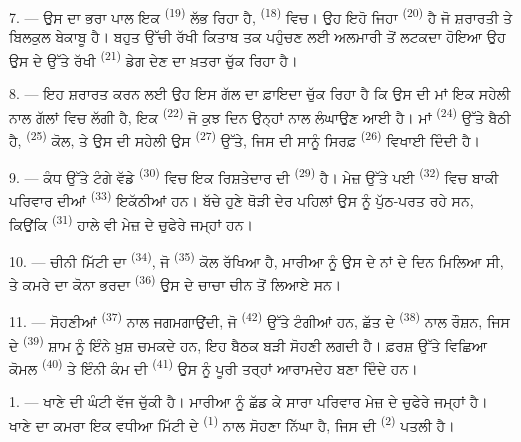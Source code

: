 \VUsaut{5.0mm}
\VUsaut{3.0mm}

7. --- ਉਸ ਦਾ ਭਰਾ ਪਾਲ ਇਕ  \textsuperscript{(19)} ਲੱਭ ਰਿਹਾ ਹੈ,
 \textsuperscript{(18)} ਵਿਚ। ਉਹ ਇਹੋ ਜਿਹਾ 
\textsuperscript{(20)} ਹੈ ਜੋ ਸ਼ਰਾਰਤੀ ਤੇ ਬਿਲਕੁਲ ਬੇਕਾਬੂ ਹੈ। ਬਹੁਤ ਉੱਚੀ ਰੱਖੀ ਕਿਤਾਬ ਤਕ
ਪਹੁੰਚਣ ਲਈ ਅਲਮਾਰੀ ਤੋਂ ਲਟਕਦਾ ਹੋਇਆ ਉਹ ਉਸ ਦੇ ਉੱਤੇ ਰੱਖੀ 
\textsuperscript{(21)} ਡੇਗ ਦੇਣ ਦਾ ਖ਼ਤਰਾ ਚੁੱਕ ਰਿਹਾ ਹੈ।

8. --- ਇਹ ਸ਼ਰਾਰਤ ਕਰਨ ਲਈ ਉਹ ਇਸ ਗੱਲ ਦਾ ਫ਼ਾਇਦਾ ਚੁੱਕ ਰਿਹਾ ਹੈ ਕਿ ਉਸ ਦੀ ਮਾਂ ਇਕ ਸਹੇਲੀ
ਨਾਲ ਗੱਲਾਂ ਵਿਚ ਲੱਗੀ ਹੈ, ਇਕ  \textsuperscript{(22)} ਜੋ ਕੁਝ ਦਿਨ ਉਨ੍ਹਾਂ
ਨਾਲ ਲੰਘਾਉਣ ਆਈ ਹੈ। ਮਾਂ  \textsuperscript{(24)} ਉੱਤੇ ਬੈਠੀ ਹੈ,
 \textsuperscript{(25)} ਕੋਲ, ਤੇ ਉਸ ਦੀ ਸਹੇਲੀ ਉਸ 
\textsuperscript{(27)} ਉੱਤੇ, ਜਿਸ ਦੀ ਸਾਨੂੰ ਸਿਰਫ਼ 
\textsuperscript{(26)} ਵਿਖਾਈ ਦਿੰਦੀ ਹੈ।

9. --- ਕੰਧ ਉੱਤੇ ਟੰਗੇ ਵੱਡੇ  \textsuperscript{(30)} ਵਿਚ ਇਕ ਰਿਸ਼ਤੇਦਾਰ
ਦੀ  \textsuperscript{(29)} ਹੈ। ਮੇਜ਼ ਉੱਤੇ ਪਈ 
\textsuperscript{(32)} ਵਿਚ ਬਾਕੀ ਪਰਿਵਾਰ ਦੀਆਂ 
\textsuperscript{(33)} ਇਕੱਠੀਆਂ ਹਨ। ਬੱਚੇ ਹੁਣੇ ਥੋੜੀ ਦੇਰ ਪਹਿਲਾਂ ਉਸ ਨੂੰ ਪੁੱਠ-ਪਰਤ ਰਹੇ
ਸਨ, ਕਿਉਂਕਿ  \textsuperscript{(31)} ਹਾਲੇ ਵੀ ਮੇਜ਼ ਦੇ ਚੁਫੇਰੇ ਜਮ੍ਹਾਂ
ਹਨ।

10. --- ਚੀਨੀ ਮਿੱਟੀ ਦਾ  \textsuperscript{(34)}, ਜੋ
 \textsuperscript{(35)} ਕੋਲ ਰੱਖਿਆ ਹੈ, ਮਾਰੀਆ ਨੂੰ ਉਸ ਦੇ
ਨਾਂ ਦੇ ਦਿਨ ਮਿਲਿਆ ਸੀ, ਤੇ ਕਮਰੇ ਦਾ ਕੋਨਾ ਭਰਦਾ 
\textsuperscript{(36)} ਉਸ ਦੇ ਚਾਚਾ ਚੀਨ ਤੋਂ ਲਿਆਏ ਸਨ।

11. --- ਸੋਹਣੀਆਂ  \textsuperscript{(37)} ਨਾਲ ਜਗਮਗਾਉਂਦੀ, ਜੋ
 \textsuperscript{(42)} ਉੱਤੇ ਟੰਗੀਆਂ ਹਨ, ਛੱਤ ਦੇ 
\textsuperscript{(38)} ਨਾਲ ਰੌਸ਼ਨ, ਜਿਸ ਦੇ 
\textsuperscript{(39)} ਸ਼ਾਮ ਨੂੰ ਇੰਨੇ ਖ਼ੁਸ਼ ਚਮਕਦੇ ਹਨ, ਇਹ ਬੈਠਕ ਬੜੀ ਸੋਹਣੀ ਲਗਦੀ ਹੈ।
ਫ਼ਰਸ਼ ਉੱਤੇ ਵਿਛਿਆ ਕੋਮਲ  \textsuperscript{(40)} ਤੇ ਇੰਨੀ ਕੰਮ ਦੀ
 \textsuperscript{(41)} ਉਸ ਨੂੰ ਪੂਰੀ ਤਰ੍ਹਾਂ ਆਰਾਮਦੇਹ ਬਣਾ ਦਿੰਦੇ
ਹਨ।

\VUsaut{3.6mm}
\VUsaut{3.0mm}

1. --- ਖਾਣੇ ਦੀ ਘੰਟੀ ਵੱਜ ਚੁੱਕੀ ਹੈ। ਮਾਰੀਆ ਨੂੰ ਛੱਡ ਕੇ ਸਾਰਾ ਪਰਿਵਾਰ ਮੇਜ਼ ਦੇ ਚੁਫੇਰੇ
ਜਮ੍ਹਾਂ ਹੈ। ਖਾਣੇ ਦਾ ਕਮਰਾ ਇਕ ਵਧੀਆ ਮਿੱਟੀ ਦੇ  \textsuperscript{(1)}
ਨਾਲ ਸੋਹਣਾ ਨਿੱਘਾ ਹੈ, ਜਿਸ ਦੀ  \textsuperscript{(2)} ਪਤਲੀ ਹੈ।

